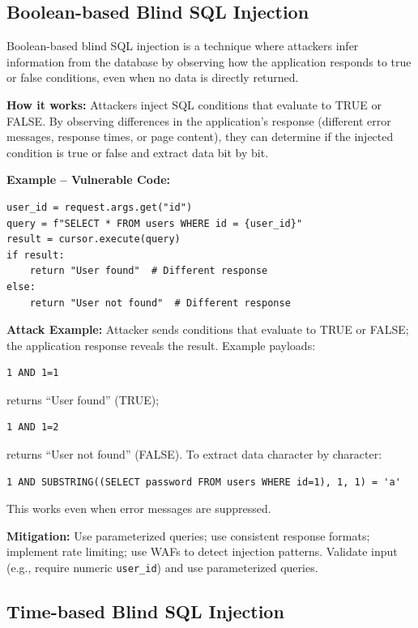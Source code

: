 \subsection{Boolean-based Blind SQL Injection}
\label{sec:sqli_boolean_blind}

Boolean-based blind SQL injection is a technique where attackers infer information from the database by observing how the application responds to true or false conditions, even when no data is directly returned.

\textbf{How it works:} Attackers inject SQL conditions that evaluate to TRUE or FALSE. By observing differences in the application's response (different error messages, response times, or page content), they can determine if the injected condition is true or false and extract data bit by bit.

\textbf{Example -- Vulnerable Code:}

\begin{lstlisting}[style=pycode]
user_id = request.args.get("id")
query = f"SELECT * FROM users WHERE id = {user_id}"
result = cursor.execute(query)
if result:
    return "User found"  # Different response
else:
    return "User not found"  # Different response
\end{lstlisting}

\textbf{Attack Example:} Attacker sends conditions that evaluate to TRUE or FALSE; the application response reveals the result. Example payloads:
\begin{lstlisting}[style=attackcode]
1 AND 1=1
\end{lstlisting}
returns ``User found'' (TRUE);
\begin{lstlisting}[style=attackcode]
1 AND 1=2
\end{lstlisting}
returns ``User not found'' (FALSE). To extract data character by character:
\begin{lstlisting}[style=attackcode]
1 AND SUBSTRING((SELECT password FROM users WHERE id=1), 1, 1) = 'a'
\end{lstlisting}
This works even when error messages are suppressed.

\textbf{Mitigation:} Use parameterized queries; use consistent response formats; implement rate limiting; use WAFs to detect injection patterns. Validate input (e.g., require numeric \texttt{user\_id}) and use parameterized queries.

\subsection{Time-based Blind SQL Injection}
\label{sec:sqli_time_based}

